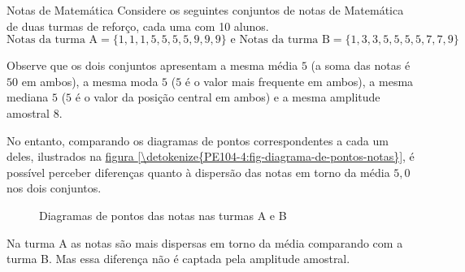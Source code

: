 \begin{example}{Notas de Matemática}
\label{exemp-notas1}
Considere os seguintes conjuntos de notas de Matemática de duas turmas de reforço, cada uma com 10 alunos.
$$\text{Notas da turma A}=\{ 1,1,1,5,5,5,5,9,9,9\} \text{ e } \text{Notas da turma B}=\{1,3,3,5,5,5,5,7,7,9\}$$

Observe que os dois conjuntos apresentam a mesma média $5$ (a soma das notas é $50$ em ambos), a mesma moda $5$ ($5$ é o valor mais frequente em ambos), a mesma mediana $5$ ($5$ é o valor da posição central em ambos) e a mesma amplitude amostral $8$.

No entanto, comparando os diagramas de pontos correspondentes a cada um deles, ilustrados na \hyperref[\detokenize{PE104-4:fig-diagrama-de-pontos-notas}]{figura \ref{\detokenize{PE104-4:fig-diagrama-de-pontos-notas}}}, é possível perceber diferenças quanto à dispersão das notas em torno da média $5{,}0$ nos dois conjuntos.

\begin{figure}[H]
\centering
\capstart

\resizebox{\linewidth}{!}
{
\hspace{2em}
}

\caption{Diagramas de pontos das notas nas turmas A e B}\label{\detokenize{PE104-4:fig-diagrama-de-pontos-notas}}\label{\detokenize{PE104-4:id2}}\end{figure}

Na turma A as notas são mais dispersas em torno da média comparando com a turma B. Mas essa diferença não é captada pela amplitude amostral.
\end{example}


